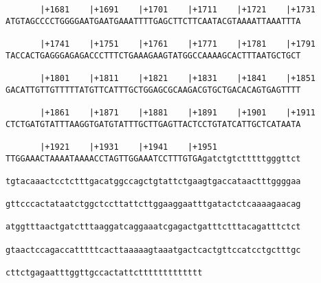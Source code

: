 \documentclass{article}
\begin{document}
\begin{Verbatim}
       |+1681    |+1691    |+1701    |+1711    |+1721    |+1731
ATGTAGCCCCTGGGGAATGAATGAAATTTTGAGCTTCTTCAATACGTAAAATTAAATTTA
                                                            
       |+1741    |+1751    |+1761    |+1771    |+1781    |+1791
TACCACTGAGGGAGAGACCCTTTCTGAAAGAAGTATGGCCAAAAGCACTTTAATGCTGCT
                                                            
       |+1801    |+1811    |+1821    |+1831    |+1841    |+1851
GACATTGTTGTTTTTATGTTCATTTGCTGGAGCGCAAGACGTGCTGACACAGTGAGTTTT
                                                            
       |+1861    |+1871    |+1881    |+1891    |+1901    |+1911
CTCTGATGTATTTAAGGTGATGTATTTGCTTGAGTTACTCCTGTATCATTGCTCATAATA
                                                            
       |+1921    |+1931    |+1941    |+1951                 
TTGGAAACTAAAATAAAACCTAGTTGGAAATCCTTTGTGAgatctgtctttttgggttct
                                                            
tgtacaaactcctctttgacatggccagctgtattctgaagtgaccataactttggggaa
                                                            
gttcccactataatctggctccttattcttggaaggaatttgatactctcaaaagaacag
                                                            
atggtttaactgatctttaaggatcaggaaatcgagactgatttctttacagatttctct
                                                            
gtaactccagaccatttttcacttaaaaagtaaatgactcactgttccatcctgctttgc
                                                            
cttctgagaatttggttgccactattcttttttttttttt
                                        
                                        
\end{Verbatim}
\end{document}
